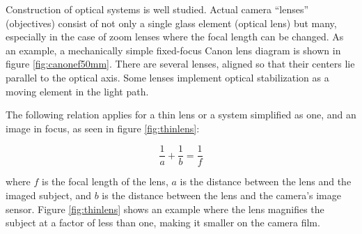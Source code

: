 Construction of optical systems is well studied. \cite{kingslake1989history,greenleaf1950photographic}
Actual camera ``lenses'' (objectives) consist of not only a single glass element (optical lens) but many, especially in the case of zoom lenses where the focal length can be changed.
As an example, a mechanically simple fixed-focus Canon lens diagram is shown in figure \ref{fig:canonef50mm}.
There are several lenses, aligned so that their centers lie parallel to the optical axis.
Some lenses implement optical stabilization as a moving element in the light path.




The following relation applies for a thin lens or a system simplified as one, and an image in focus, as seen in figure \ref{fig:thinlens}:

\begin{equation}
	\frac{1}{a} + \frac{1}{b} = \frac{1}{f} \label{eq:focal}
\end{equation}


where $f$ is the focal length of the lens, $a$ is the distance between the lens and the imaged subject, and $b$ is the distance between the lens and the camera's image sensor. Figure \ref{fig:thinlens} shows an example where the lens magnifies the subject at a factor of less than one, making it smaller on the camera film.


